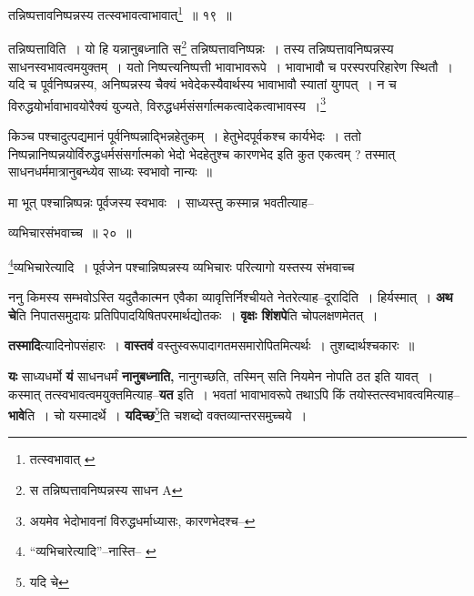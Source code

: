 \documentclass[article,12pt,a4paper]{memoir}
\begin{document}
	  \bigskip
	  \begingroup
	

	  \pstart तन्निष्पत्तावनिष्पन्नस्य तत्स्वभावत्वाभावात्\footnote{तत्स्वभावात् \cite{dp-msC}} ॥ १९ ॥
	\pend
      
	  \endgroup
	 

	  \pstart तन्निष्पत्ताविति । यो हि यन्नानुबध्नाति स\footnote{स तन्निष्पत्तावनिष्पन्नस्य साधन A} तन्निष्पत्तावनिष्पन्नः । तस्य तन्निष्पत्तावनिष्पन्नस्य साधनस्वभावत्वमयुक्तम् । यतो निष्पत्त्यनिष्पत्ती भावाभावरूपे । भावाभावौ च परस्परपरिहारेण स्थितौ । यदि च पूर्वनिष्पन्नस्य, अनिष्पन्नस्य चैक्यं भवेदेकस्यैवार्थस्य भावाभावौ स्यातां युगपत् । न च विरुद्धयोर्भावाभावयोरैक्यं युज्यते, विरुद्धधर्मसंसर्गात्मकत्वादेकत्वाभावस्य ।\footnote{अयमेव भेदोभावनां विरुद्धधर्माध्यासः, कारणभेदश्च--\cite{dp-msD-n}}
	\pend
       

	  \pstart किञ्च पश्चादुत्पद्यमानं पूर्वनिष्पन्नाद्भिन्नहेतुकम् । हेतुभेदपूर्वकश्च कार्यभेदः । ततो निष्पन्नानिष्पन्नयोर्विरुद्धधर्मसंसर्गात्मको भेदो भेदहेतुश्च कारणभेद इति कुत एकत्वम् ? तस्मात् साधनधर्ममात्रानुबन्ध्येव साध्यः स्वभावो नान्यः ॥
	\pend
       

	  \pstart मा भूत् पश्चान्निष्पन्नः पूर्वजस्य स्वभावः । साध्यस्तु कस्मान्न भवतीत्याह--
	\pend
       
	  \bigskip
	  \begingroup
	

	  \pstart व्यभिचारसंभवाच्च ॥ २० ॥
	\pend
      
	  \endgroup
	 

	  \pstart \footnote{“व्यभिचारेत्यादि”--नास्ति--\cite{dp-msA} \cite{dp-msB} \cite{dp-msD} \cite{dp-edP} \cite{dp-edH} \cite{dp-edE} \cite{dp-edN}}व्यभिचारेत्यादि । पूर्वजेन पश्चान्निष्पन्नस्य व्यभिचारः परित्यागो यस्तस्य संभवाच्च
	\pend
      
	  \endgroup
	

	  \pstart ननु किमस्य सम्भवोऽस्ति यदुतैकात्मन एवैका व्यावृत्तिर्निश्चीयते नेतरेत्याह--दूरादिति । हिर्यस्मात् । \textbf{अथ चे}ति निपातसमुदायः प्रतिपिपादयिषितपरमार्थद्योतकः । \textbf{वृक्षः शिंशपे}ति चोपलक्षणमेतत् ।
	\pend
      

	  \pstart \textbf{तस्मादि}त्यादिनोपसंहारः । \textbf{वास्तवं} वस्तुस्वरूपादागतमसमारोपितमित्यर्थः । तुशब्दार्थश्चकारः ॥
	\pend
      

	  \pstart \textbf{यः} साध्यधर्मो \textbf{यं} साधनधर्मं \textbf{नानुबध्नाति,} नानुगच्छति, तस्मिन् सति नियमेन नोपति ठत इति यावत् । कस्मात् तत्स्वभावत्वमयुक्तमित्याह--\textbf{यत} इति । भवतां भावाभावरूपे तथाऽपि किं तयोस्तत्स्वभावत्वमित्याह--\textbf{भावे}ति । चो यस्मादर्थे । \textbf{यदिच्छ}\footnote{यदि चे}ति चशब्दो वक्तव्यान्तरसमुच्चये ।
	\pend
      \leavevmode{}
	  \bigskip
	  \begingroup
	
\end{document}
